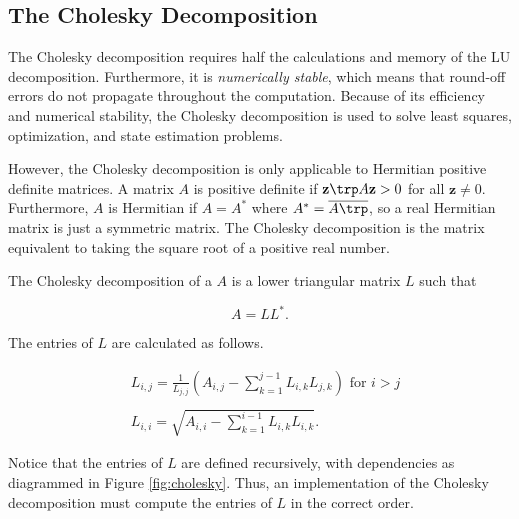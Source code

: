 \subsection*{The Cholesky Decomposition} %

The Cholesky decomposition requires half the calculations and memory of the LU decomposition.
Furthermore, it is \emph{numerically stable}, which means that round-off errors do not propagate throughout the computation.
Because of its efficiency and numerical stability, the Cholesky decomposition is used to solve least squares, optimization, and state estimation problems.

However, the Cholesky decomposition is only applicable to Hermitian positive definite matrices.
A matrix $A$ is positive definite if  $\mathbf{z}\trp A\mathbf{z} > 0$ for all $\mathbf{z} \neq 0$.
Furthermore, $A$ is Hermitian if $A = A^*$ where $A^* = \overline{A\trp }$, so a real Hermitian matrix is just a symmetric matrix.
The Cholesky decomposition is the matrix equivalent to taking the square root of a positive real number.

The Cholesky decomposition of a $A$ is a lower triangular matrix $L$ such that

\begin{equation*}
 A = LL^*.
\end{equation*}

The entries of $L$ are calculated as follows.

\begin{align*}
&L_{i,j} = \frac{1}{L_{j,j}}\left(A_{i,j} -\sum_{k=1}^{j-1}{L_{i,k}L_{j,k}}\right) \mbox{ for $i>j$} \\ \\
&L_{i,i} = \sqrt{A_{i,i} - \sum_{k=1}^{i-1}{L_{i,k}L_{i,k}}}.
\end{align*}

Notice that the entries of $L$ are defined recursively, with dependencies as diagrammed in Figure \ref{fig:cholesky}.
Thus, an implementation of the Cholesky decomposition must compute the entries of $L$ in the correct order.

